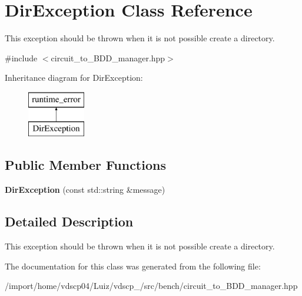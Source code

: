 \section{Dir\+Exception Class Reference}
\label{classDirException}


This exception should be thrown when it is not possible create a directory.  




{\ttfamily \#include $<$circuit\+\_\+to\+\_\+\+B\+D\+D\+\_\+manager.\+hpp$>$}

Inheritance diagram for Dir\+Exception\+:\begin{figure}[H]
\begin{center}
\leavevmode
\includegraphics[height=2.000000cm]{classDirException}
\end{center}
\end{figure}
\subsection*{Public Member Functions}
\begin{DoxyCompactItemize}
\item 
{\bfseries Dir\+Exception} (const std\+::string \&message)\label{classDirException_a33ced612aa6ea89e5cc843e20d5c54c3}

\end{DoxyCompactItemize}


\subsection{Detailed Description}
This exception should be thrown when it is not possible create a directory. 

The documentation for this class was generated from the following file\+:\begin{DoxyCompactItemize}
\item 
/import/home/vdscp04/\+Luiz/vdscp\+\_/src/bench/circuit\+\_\+to\+\_\+\+B\+D\+D\+\_\+manager.\+hpp\end{DoxyCompactItemize}
